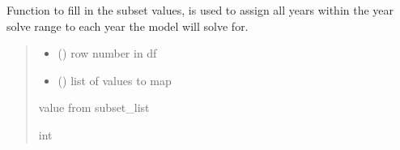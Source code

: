 \documentclass[letterpaper,10pt,english]{sphinxmanual}
\begin{document}
\begin{fulllineitems}
\label{\detokenize{src.models.electricity.scripts.preprocessor:src.models.electricity.scripts.preprocessor.fill_values}}
\pysigstartsignatures
\pysiglinewithargsret
{}
{\sphinxparamcomma {}}
{}
\pysigstopsignatures
\sphinxAtStartPar
Function to fill in the subset values, is used to assign all years within the year
solve range to each year the model will solve for.
\begin{quote}\begin{description}
\begin{itemize}
\item {} 
\sphinxAtStartPar
{} () \textendash{} row number in df

\item {} 
\sphinxAtStartPar
{} () \textendash{} list of values to map

\end{itemize}

\sphinxAtStartPar
value from subset\_list

\sphinxAtStartPar
int

\end{description}\end{quote}

\end{fulllineitems}

\end{document}
